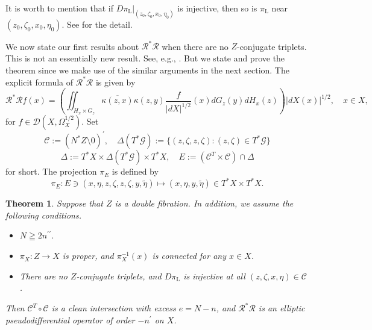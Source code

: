 \documentclass[a4paper,11pt,reqno]{amsart}
\newtheorem{theorem}{Theorem}%
\theoremstyle{definition}
\theoremstyle{remark}
\begin{document}
%
%
It is worth to mention that if $D\pi_\text{L}\vert_{(z_0,\zeta_0,x_0,\eta_0)}$ is injective, 
then so is $\pi_\text{L}$ near $(z_0,\zeta_0,x_0,\eta_0)$. 
See \cite[{Lemma~3.4}]{MazzucchelliSaloTzou} for the detail. 
%
%
\par
%
%
We now state our first results about $\mathcal{R}^\ast\mathcal{R}$ 
when there are no $Z$-conjugate triplets. 
This is not an essentially new result. See, e.g., \cite{Quinto}. 
But we state and prove the theorem 
since we make use of the similar arguments in the next section. 
The explicit formula of $\mathcal{R}^\ast\mathcal{R}$ is given by 
%
%
\begin{equation}
\mathcal{R}^\ast\mathcal{R}f(x)
=
\left(
\iint_{H_x{\times}G_z}
\overline{\kappa(z,x)}
\kappa(z,y)
\frac{f}{\lvert{dX}\rvert^{1/2}}(x)
dG_z(y)dH_x(z) 
\right)
\lvert{dX(x)}\rvert^{1/2}, 
\quad
x \in X,
\label{equation:normal}
\end{equation}
%
%
for $f \in \mathscr{D}(X,\Omega_X^{1/2})$. 
Set 
%
%
$$
\mathcal{C}:=(N^\ast{Z}\setminus0)^\prime,
\quad  
\Delta(T^\ast\mathcal{G}):=\{(z,\zeta,z,\zeta) : (z,\zeta) \in T^\ast\mathcal{G}\}
$$ 
%
%
$$
\Delta:=T^\ast{X}\times\Delta(T^\ast\mathcal{G}){\times}T^\ast{X},
\quad
E:=(\mathcal{C}^T\times\mathcal{C})\cap\Delta
$$
%
%
for short. The projection $\pi_E$ is defined by 
%
%
$$
\pi_E: 
E\ni(x,\eta,z,\zeta,z,\zeta,y,\tilde{\eta}) 
\mapsto 
(x,\eta,y,\tilde{\eta})
\in 
T^\ast{X}{\times}T^\ast{X}. 
$$
%
%
\begin{theorem}
\label{theorem:normal1}
Suppose that $Z$ is a double fibration. 
In addition, we assume the following conditions.
\begin{itemize}
\item 
$N \geqq 2n^{\prime\prime}$. 
\item 
$\pi_X: Z \rightarrow X$ is proper, and $\pi_X^{-1}(x)$ is connected for any $x \in X$. 
\item 
There are no $Z$-conjugate triplets, 
and $D\pi_\text{L}$ is injective at all $(z,\zeta,x,\eta) \in \mathcal{C}$. 
\end{itemize}
%
%
Then $\mathcal{C}^T\circ\mathcal{C}$ is a clean intersection with excess $e=N-n$, 
and $\mathcal{R}^\ast\mathcal{R}$ is an elliptic pseudodifferential operator of order $-n^\prime$ on $X$.   
\end{theorem}
% 
%
\end{document}
